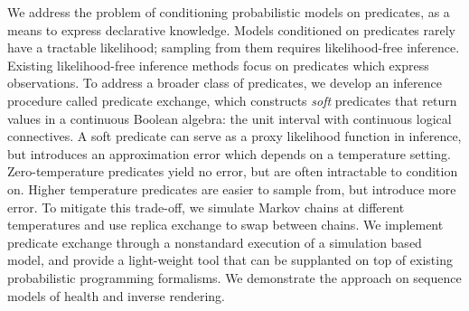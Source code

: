 We address the problem of conditioning probabilistic models on predicates, as a means to express declarative knowledge.
Models conditioned on predicates rarely have a tractable likelihood; sampling from them requires likelihood-free inference.
Existing likelihood-free inference methods
focus on predicates which express observations.
To address a broader class of predicates, we develop an inference procedure called predicate exchange, which constructs \emph{soft} predicates that return values in a continuous Boolean algebra: the unit interval with continuous logical connectives.
A soft predicate can serve as a proxy likelihood function in inference,
but introduces an approximation error which depends on a temperature setting.
Zero-temperature predicates yield no error, but are often intractable to condition on.
Higher temperature predicates are easier to sample from, but introduce more error. 
To mitigate this trade-off, we simulate Markov chains at different temperatures and use 
replica exchange to swap between chains.
We implement predicate exchange through a nonstandard execution of a simulation based model, and provide a light-weight tool that can be supplanted on top of existing probabilistic programming formalisms. 
We demonstrate the approach on sequence models of health and inverse rendering.



% 